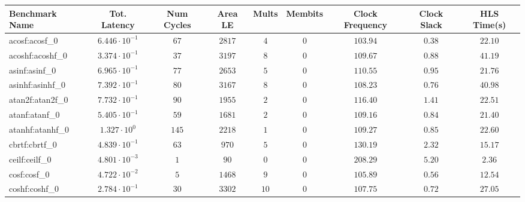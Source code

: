 \begin{tabular}{|l|c|c|c|c|c|c|c|c|}
\hline
Benchmark Name               & Tot. Latency            & Num Cycles & Area LE   & Mults   & Membits & Clock Frequency & Clock Slack & HLS Time(s) \\
\hline
acosf:acosf\_0               & $ 6.446 \cdot 10^{-1} $ & $ 67     $ & $ 2817  $ & $ 4   $ & $ 0   $ & $ 103.94      $ & $ 0.38    $ & $ 22.10   $ \\
acoshf:acoshf\_0             & $ 3.374 \cdot 10^{-1} $ & $ 37     $ & $ 3197  $ & $ 8   $ & $ 0   $ & $ 109.67      $ & $ 0.88    $ & $ 41.19   $ \\
asinf:asinf\_0               & $ 6.965 \cdot 10^{-1} $ & $ 77     $ & $ 2653  $ & $ 5   $ & $ 0   $ & $ 110.55      $ & $ 0.95    $ & $ 21.76   $ \\
asinhf:asinhf\_0             & $ 7.392 \cdot 10^{-1} $ & $ 80     $ & $ 3167  $ & $ 8   $ & $ 0   $ & $ 108.23      $ & $ 0.76    $ & $ 40.98   $ \\
atan2f:atan2f\_0             & $ 7.732 \cdot 10^{-1} $ & $ 90     $ & $ 1955  $ & $ 2   $ & $ 0   $ & $ 116.40      $ & $ 1.41    $ & $ 22.51   $ \\
atanf:atanf\_0               & $ 5.405 \cdot 10^{-1} $ & $ 59     $ & $ 1681  $ & $ 2   $ & $ 0   $ & $ 109.16      $ & $ 0.84    $ & $ 21.40   $ \\
atanhf:atanhf\_0             & $ 1.327 \cdot 10^{0}  $ & $ 145    $ & $ 2218  $ & $ 1   $ & $ 0   $ & $ 109.27      $ & $ 0.85    $ & $ 22.60   $ \\
cbrtf:cbrtf\_0               & $ 4.839 \cdot 10^{-1} $ & $ 63     $ & $ 970   $ & $ 5   $ & $ 0   $ & $ 130.19      $ & $ 2.32    $ & $ 15.17   $ \\
ceilf:ceilf\_0               & $ 4.801 \cdot 10^{-3} $ & $ 1      $ & $ 90    $ & $ 0   $ & $ 0   $ & $ 208.29      $ & $ 5.20    $ & $ 2.36    $ \\
cosf:cosf\_0                 & $ 4.722 \cdot 10^{-2} $ & $ 5      $ & $ 1468  $ & $ 9   $ & $ 0   $ & $ 105.89      $ & $ 0.56    $ & $ 12.54   $ \\
coshf:coshf\_0               & $ 2.784 \cdot 10^{-1} $ & $ 30     $ & $ 3302  $ & $ 10  $ & $ 0   $ & $ 107.75      $ & $ 0.72    $ & $ 27.05   $ \\

\end{tabular}
